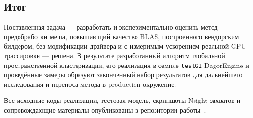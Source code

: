 \subsection{Итог}

Поставленная задача --- разработать и экспериментально оценить
метод предобработки меша, повышающий качество BLAS, построенного
вендорским билдером, без модификации драйвера и с измеримым
ускорением реальной GPU-трассировки --- решена. В результате разработанный
алгоритм глобальной пространственной кластеризации, его реализация в
семпле \texttt{testGI} DagorEngine и проведённые замеры образуют
законченный набор результатов для дальнейшего исследования и
переноса метода в production-окружение.

Все исходные коды реализации, тестовая модель, скриншоты
Nsight-захватов и сопровождающие материалы опубликованы в
репозитории работы~\cite{thesisRepo}.
